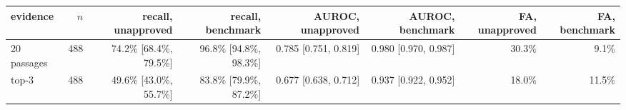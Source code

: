 \begin{tabular}{lrrrrrrr}
\toprule
evidence & $n$ & recall, unapproved & recall, benchmark & AUROC, unapproved & AUROC, benchmark & FA, unapproved & FA, benchmark \\
\midrule
20 passages & 488 & 74.2\% [68.4\%, 79.5\%] & 96.8\% [94.8\%, 98.3\%] & 0.785 [0.751, 0.819] & 0.980 [0.970, 0.987] & 30.3\% & 9.1\% \\
top-3 & 488 & 49.6\% [43.0\%, 55.7\%] & 83.8\% [79.9\%, 87.2\%] & 0.677 [0.638, 0.712] & 0.937 [0.922, 0.952] & 18.0\% & 11.5\% \\
\bottomrule
\end{tabular}

